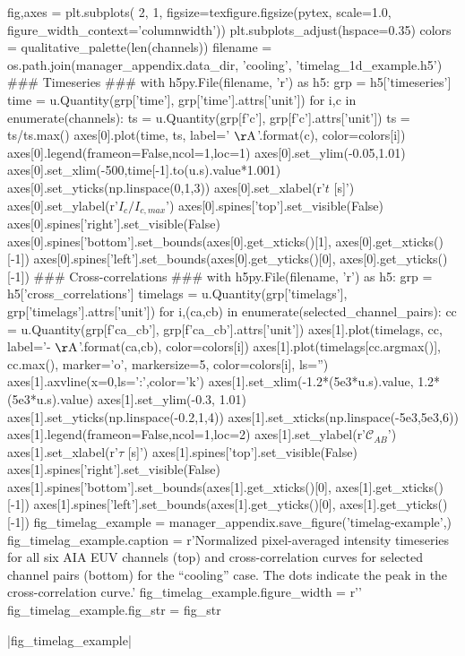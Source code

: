 \begin{pycode}
fig,axes = plt.subplots(
    2, 1, figsize=texfigure.figsize(pytex, scale=1.0,
                                    figure_width_context='columnwidth'))
plt.subplots_adjust(hspace=0.35)
colors = qualitative_palette(len(channels))
filename = os.path.join(manager_appendix.data_dir, 'cooling', 'timelag_1d_example.h5')
### Timeseries ###
with h5py.File(filename, 'r') as h5:
    grp = h5['timeseries']
    time = u.Quantity(grp['time'], grp['time'].attrs['unit'])
    for i,c in enumerate(channels):
        ts = u.Quantity(grp[f'{c}'], grp[f'{c}'].attrs['unit'])
        ts = ts/ts.max()
        axes[0].plot(time, ts, label='{} $\mathrm{{\AA}}$'.format(c),
                        color=colors[i])
axes[0].legend(frameon=False,ncol=1,loc=1)
axes[0].set_ylim(-0.05,1.01)
axes[0].set_xlim(-500,time[-1].to(u.s).value*1.001)
axes[0].set_yticks(np.linspace(0,1,3))
axes[0].set_xlabel(r'$t$ [s]')
axes[0].set_ylabel(r'$I_{c}/I_{c,max}$')
axes[0].spines['top'].set_visible(False)
axes[0].spines['right'].set_visible(False)
axes[0].spines['bottom'].set_bounds(axes[0].get_xticks()[1], axes[0].get_xticks()[-1])
axes[0].spines['left'].set_bounds(axes[0].get_yticks()[0], axes[0].get_yticks()[-1])
### Cross-correlations ###
with h5py.File(filename, 'r') as h5:
    grp = h5['cross_correlations']
    timelags = u.Quantity(grp['timelags'], grp['timelags'].attrs['unit'])
    for i,(ca,cb) in enumerate(selected_channel_pairs):
        cc = u.Quantity(grp[f'{ca}_{cb}'], grp[f'{ca}_{cb}'].attrs['unit'])
        axes[1].plot(timelags, cc, label='{}-{} $\mathrm{{\AA}}$'.format(ca,cb),
                        color=colors[i])
        axes[1].plot(timelags[cc.argmax()], cc.max(), marker='o', markersize=5,
                        color=colors[i], ls='')
axes[1].axvline(x=0,ls=':',color='k')
axes[1].set_xlim(-1.2*(5e3*u.s).value, 1.2*(5e3*u.s).value)
axes[1].set_ylim(-0.3, 1.01)
axes[1].set_yticks(np.linspace(-0.2,1,4))
axes[1].set_xticks(np.linspace(-5e3,5e3,6))
axes[1].legend(frameon=False,ncol=1,loc=2)
axes[1].set_ylabel(r'$\mathcal{C}_{AB}$')
axes[1].set_xlabel(r'$\tau$ [s]')
axes[1].spines['top'].set_visible(False)
axes[1].spines['right'].set_visible(False)
axes[1].spines['bottom'].set_bounds(axes[1].get_xticks()[0], axes[1].get_xticks()[-1])
axes[1].spines['left'].set_bounds(axes[1].get_yticks()[0], axes[1].get_yticks()[-1])
fig_timelag_example = manager_appendix.save_figure('timelag-example',)
fig_timelag_example.caption = r'Normalized pixel-averaged intensity timeseries for all six AIA EUV channels (top) and cross-correlation curves for selected channel pairs (bottom) for the ``cooling'' case. The dots indicate the peak in the cross-correlation curve.'
fig_timelag_example.figure_width = r'\columnwidth'
fig_timelag_example.fig_str = fig_str
\end{pycode}
|fig_timelag_example|
    
